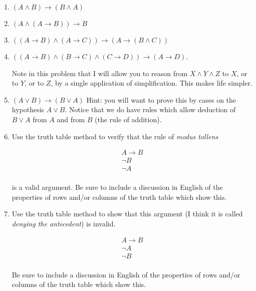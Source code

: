 \documentclass[12pt]{article}
\begin{document}
\begin{enumerate}

\item $(A \wedge B) \rightarrow (B \wedge A)$

\item $(A \wedge (A \rightarrow B)) \rightarrow B$


\item $((A \rightarrow B) \wedge (A \rightarrow C)) \rightarrow (A \rightarrow (B \wedge C))$

\item $((A \rightarrow B) \wedge (B \rightarrow C) \wedge (C \rightarrow D)) \rightarrow (A \rightarrow D)$.

Note in this problem that I will allow you to reason from $X \wedge Y \wedge Z$ to $X$, or to $Y$, or to $Z$, by a single application of simplification.  This makes life simpler.

\item $(A \vee B) \rightarrow (B \vee A)$  Hint: you will want to prove this by cases on the hypothesis $A \vee B$.  Notice that we do have rules which allow deduction
of $B \vee A$ from $A$ and from $B$ (the rule of addition).

\item Use the truth table method to verify that the rule of {\em modus tollens\/}

$$\begin{array}{c}

A \rightarrow B \\ 

\neg B \\ \hline

\neg A \\

\end{array}$$

is a valid argument.  Be sure to include a discussion in English of the properties of rows and/or columns of the truth table which show this.

\item Use the truth table method to show that this argument (I think it is called {\em denying the antecedent\/}) is invalid.

$$\begin{array}{c}

A \rightarrow B \\ 

\neg A \\ \hline

\neg B \\

\end{array}$$

Be sure to include a discussion in English of the properties of rows and/or columns of the truth table which show this.

\end{enumerate}
\end{document}

